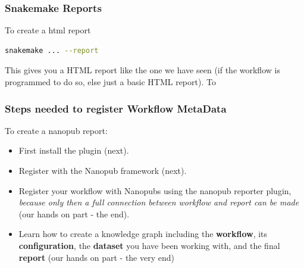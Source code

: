 \begin{frame}[fragile]
	\frametitle{Snakemake Reports}
	To create a html report
	\begin{lstlisting}[language=Bash, style=Shell]
snakemake ... --report
    \end{lstlisting}
    \begin{block}
        This gives you a HTML report like the one we have seen (if the workflow is programmed to do so, else just a basic HTML report). To 
    \end{block}
\end{frame}

\begin{frame}
    \frametitle{Steps needed to register Workflow MetaData}
    To create a nanopub report:
    \begin{itemize}[<+->]
        \item First install the plugin (next).
        \item Register with the Nanopub framework (next).
        \item Register your workflow with Nanopubs using the \Snakemake nanopub reporter plugin, \textit{because only then a full connection between workflow and report can be made} (our hands on part - the end).
        \item Learn how to create a knowledge graph including the \textbf{workflow}, its \textbf{configuration}, the \textbf{dataset} you have been working with, and the final \textbf{report} (our hands on part - the very end) 
    \end{itemize}
\end{frame}

